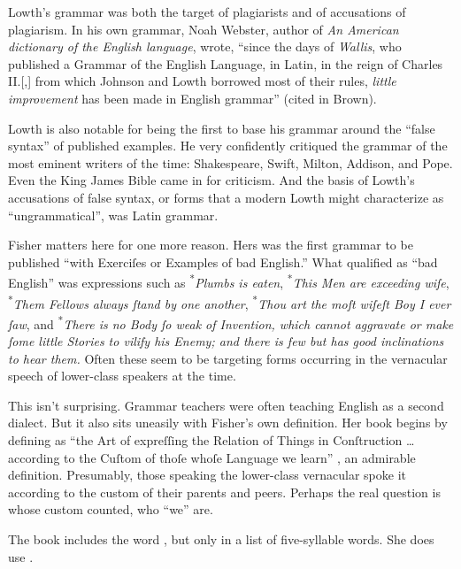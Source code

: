 Lowth's grammar was both the target of plagiarists and of accusations of plagiarism. In his own grammar, Noah Webster, author of \textit{An American dictionary of the English language}, wrote, \enquote{since the days of \textit{Wallis}, who published a Grammar of the English Language, in Latin, in the reign of Charles II.[,] from which Johnson and Lowth borrowed most of their rules, \textit{little improvement} has been made in English grammar} (cited in Brown).

Lowth is also notable for being the first to base his grammar around the \enquote{false syntax} of published examples. He very confidently critiqued the grammar of the most eminent writers of the time: Shakespeare, Swift, Milton, Addison, and Pope. Even the King James Bible came in for criticism. And the basis of Lowth's accusations of false syntax, or forms that a modern Lowth might characterize as \enquote{ungrammatical}, was Latin grammar.

\bigskip

Fisher matters here for one more reason. Hers was the first grammar to be
published \enquote{with Exerciſes or Examples of bad English.} What
qualified as \enquote{bad English} was expressions such as \textsuperscript{*}\textit{Plumbs
is eaten}, \textsuperscript{*}\textit{This Men are exceeding wiſe}, \textsuperscript{*}\textit{Them Fellows
always ſtand by one another}, \textsuperscript{*}\textit{Thou art the moſt wiſeſt Boy I
ever ſaw}, and \textsuperscript{*}\textit{There is no Body ſo weak of Invention, which
cannot aggravate or make ſome little Stories to vilify his Enemy; and
there is few but has good inclinations to hear them.} Often these seem to
be targeting forms occurring in the vernacular speech of lower-class
speakers at the time.

This isn't surprising. Grammar teachers were often teaching English as a
second dialect. But it also sits uneasily with Fisher's own definition.
Her book begins by defining  as \enquote{the Art of
expreſſing the Relation of Things in Conſtruction \dots according to the
Cuſtom of thoſe whoſe Language we learn} \citep[1]{Fisher1785}, an
admirable definition. Presumably, those speaking the lower-class
vernacular spoke it according to the custom of their parents and peers.
Perhaps the real question is whose custom counted, who \enquote{we} are.

The book includes the word , but only in a list of five-syllable words. She does use .

